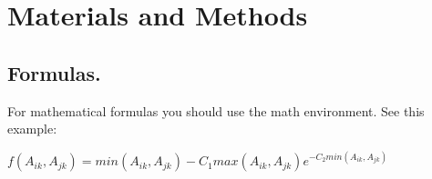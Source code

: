 \section*{Materials and Methods}

\subsection*{Formulas.}
For mathematical formulas you should use the math environment. See this example:

\begin{center}
$f(A_{ik},A_{jk}) = min(A_{ik},A_{jk}) - C_{1} max(A_{ik},A_{jk}) e^{-C_{2}min(A_{ik},A_{jk})}$
\end{center}
